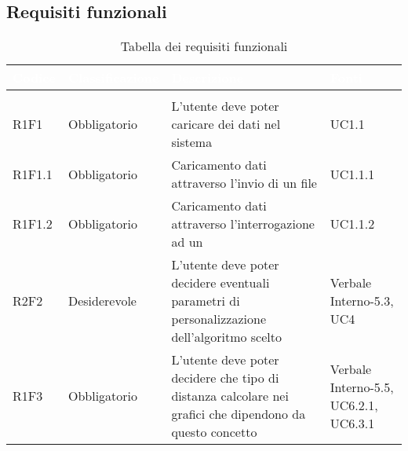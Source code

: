 \subsection{Requisiti funzionali}
\renewcommand{\arraystretch}{1.5}
\begin{center}
\begin{longtable}{C{2cm} | C{3cm} | C{7cm} | C{3.3cm}}
		\textcolor{white}{\textbf{Codice}} & 
		\textcolor{white}{\textbf{Classificazione}} & 
		\textcolor{white}{\textbf{Descrizione}} & 
		\textcolor{white}{\textbf{Fonti}} \\
		\endfirsthead
	    \\
	    \endfoot
	    \caption{Tabella dei requisiti funzionali}
	    \endlastfoot

R1F1 & Obbligatorio & L'utente deve poter caricare dei dati nel sistema & UC1.1\\
R1F1.1 & Obbligatorio & Caricamento dati attraverso l'invio di un file  & UC1.1.1\\
R1F1.2 & Obbligatorio & Caricamento dati attraverso l'interrogazione ad un  & UC1.1.2\\

R2F2 & Desiderevole & L'utente deve poter decidere eventuali parametri di personalizzazione dell'algoritmo scelto & Verbale Interno-5.3, UC4\\

R1F3 & Obbligatorio & L'utente deve poter decidere che tipo di distanza calcolare nei grafici che dipendono da questo concetto & Verbale Interno-5.5, UC6.2.1, UC6.3.1\\


\end{longtable}
\end{center}
